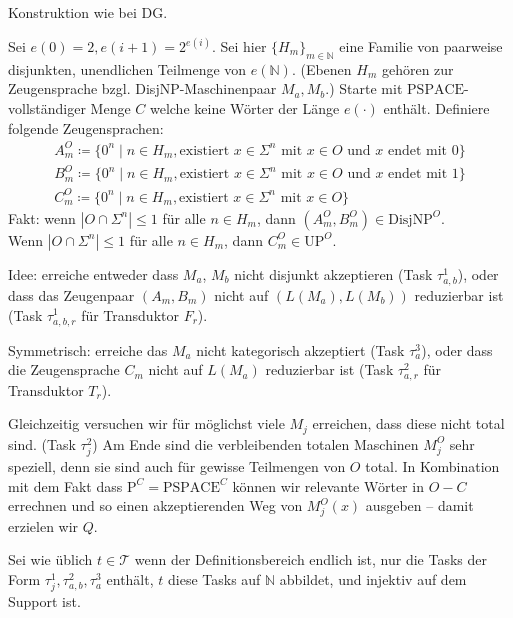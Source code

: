 \documentclass[nofonts]{uebung}
\def\P{\ensuremath{\mathrm{P}}}
\def\UP{\ensuremath{\mathrm{UP}}}
\def\DisjNP{\ensuremath{\mathrm{DisjNP}}}
\begin{document}
Konstruktion wie bei DG.

Sei $e(0)=2, e(i+1)=2^{e(i)}$. Sei hier $\{H_m\}_{m\in\mathbb N}$ eine Familie von paarweise disjunkten, unendlichen Teilmenge von $e(\mathbb N)$. (Ebenen $H_m$ gehören zur Zeugensprache bzgl. DisjNP-Maschinenpaar $M_a, M_b$.)
Starte mit $\mathrm{PSPACE}$-vollständiger Menge $C$ welche keine Wörter der Länge $e(\cdot)$ enthält.
Definiere folgende Zeugensprachen:
        \begin{gather*}
            A_m^O \coloneqq \{ 0^n \mid n\in H_m, \text{existiert $x\in \Sigma^{n}$ mit } x\in O \text{ und $x$ endet mit $0$} \}\\
            B_m^O \coloneqq \{ 0^n \mid n\in H_m, \text{existiert $x\in \Sigma^{n}$ mit } x\in O \text{ und $x$ endet mit $1$} \}\\
            C_m^O \coloneqq \{ 0^n \mid n\in H_m, \text{existiert $x\in \Sigma^{n}$ mit } x\in O  \}
        \end{gather*}
        Fakt: wenn $|O\cap \Sigma^{n}|\leq 1$ für alle $n\in H_m$, dann $(A_m^O, B_m^O)\in\DisjNP^O$.\\
        Wenn $|O\cap \Sigma^n|\leq 1$ für alle $n\in H_m$, dann $C_m^O \in \UP^O$.
\medskip

Idee: erreiche entweder dass $M_a$, $M_b$ nicht disjunkt akzeptieren (Task $\tau^1_{a,b}$), oder dass das Zeugenpaar $(A_m,B_m)$ nicht auf $(L(M_a),L(M_b))$ reduzierbar ist (Task $\tau^1_{a,b,r}$ für Transduktor $F_r$).

Symmetrisch: erreiche das $M_a$ nicht kategorisch akzeptiert (Task $\tau^3_{a}$), oder dass die Zeugensprache $C_m$ nicht auf $L(M_a)$ reduzierbar ist (Task $\tau^2_{a,r}$ für Transduktor $T_r$).

Gleichzeitig versuchen wir für möglichst viele $M_j$ erreichen, dass diese nicht total sind. (Task $\tau^2_j$)
Am Ende sind die verbleibenden totalen Maschinen $M^O_j$ sehr speziell, denn sie sind auch für gewisse Teilmengen von $O$ total.
In Kombination mit dem Fakt dass $\P^C=\mathrm{PSPACE}^C$ können wir relevante Wörter in $O-C$ errechnen und so einen akzeptierenden Weg von $M^O_j(x)$ ausgeben -- damit erzielen wir $Q$.
\medskip

Sei wie üblich $t\in \mathcal T$ wenn der Definitionsbereich endlich ist, nur die Tasks der Form $\tau^1_j, \tau^2_{a,b}, \tau^3_a$ enthält, $t$ diese Tasks auf $\mathbb N$ abbildet, und injektiv auf dem Support ist.
\end{document}
